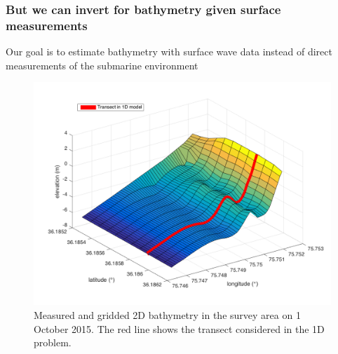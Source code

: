 \documentclass[7pt]{beamer}
\begin{document}

\begin{frame}
 \frametitle{But we can invert for bathymetry given surface measurements}

Our goal is to estimate bathymetry with surface wave data instead of direct measurements of the submarine environment

\begin{figure}[H]
	 	\centering
	 	\includegraphics[width=0.6\linewidth]{img/trueBath2D.png}
	 	\caption{Measured and gridded 2D bathymetry in the survey area on 1 October 2015. The red line shows the transect considered in the 1D problem.}
	 	\label{2D Bath}
	 	\end{figure}

\end{frame}
\end{document}
